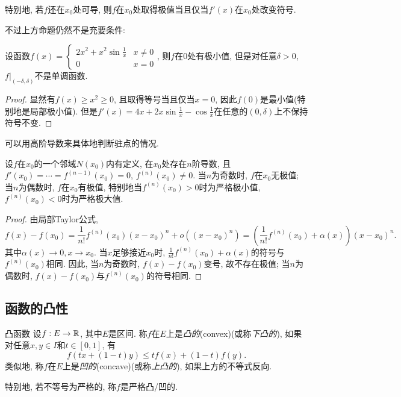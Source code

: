 特别地, 若$f$还在$x_0$处可导, 则$f$在$x_0$处取得极值当且仅当$f'(x)$在$x_0$处改变符号. 

不过上方命题仍然不是充要条件: 

\begin{example}
	设函数$f(x) = \begin{cases}
		2x^2+x^2\sin \frac{1}{x} & x \neq 0 \\ 0 & x=0
	\end{cases}$, 则$f$在$0$处有极小值, 但是对任意$\delta >0$, $f|_{(-\delta,\delta)}$不是单调函数. 
\end{example}
\begin{proof}
	显然有$f(x) \geq x^2 \geq 0$, 且取得等号当且仅当$x=0$, 因此$f(0)$是最小值(特别地是局部极小值). 但是$f'(x) = 4x+2x\sin \frac{1}{x}-\cos \frac{1}{x}$在任意的$(0,\delta)$上不保持符号不变. 
\end{proof}

可以用高阶导数来具体地判断驻点的情况. 

\begin{proposition}{}
	设$f$在$x_0$的一个邻域$N(x_0)$内有定义, 在$x_0$处存在$n$阶导数, 且$f'(x_0) = \cdots = f^{(n-1)}(x_0) = 0$, $f^{(n)}(x_0) \neq 0$. 当$n$为奇数时, $f$在$x_0$无极值; 当$n$为偶数时, $f$在$x_0$有极值, 特别地当$f^{(n)}(x_0)>0$时为严格极小值, $f^{(n)}(x_0)<0$时为严格极大值. 
\end{proposition}
\begin{proof}
	由局部Taylor公式, $$f(x)-f(x_0) = \frac{1}{n!} f^{(n)}(x_0)(x-x_0)^n+o((x-x_0)^n) = \left( \frac{1}{n!} f^{(n)}(x_0) + \alpha (x) \right)(x-x_0)^n. $$
	其中$\alpha (x) \to 0,x \to x_0$. 当$x$足够接近$x_0$时, $\frac{1}{n!} f^{(n)}(x_0) + \alpha (x)$的符号与$f^{(n)}(x_0)$相同. 因此, 当$n$为奇数时, $f(x)-f(x_0)$变号, 故不存在极值; 当$n$为偶数时, $f(x)-f(x_0)$与$f^{(n)}(x_0)$的符号相同. 
\end{proof}

\subsection{函数的凸性}

\begin{definition}{凸函数}
	设$f:E \to \mathbb{R}$, 其中$E$是区间. 称$f$在$E$上是\textit{凸的}(convex)(或称\textit{下凸的}), 如果对任意$x,y \in I$和$t \in [0,1]$, 有$$f(tx+(1-t)y) \leq tf(x)+(1-t)f(y). $$
	类似地, 称$f$在$E$上是\textit{凹的}(concave)(或称\textit{上凸的}), 如果上方的不等式反向. 
\end{definition}
\begin{remark}
	特别地, 若不等号为严格的, 称$f$是严格凸/凹的. 
\end{remark}

